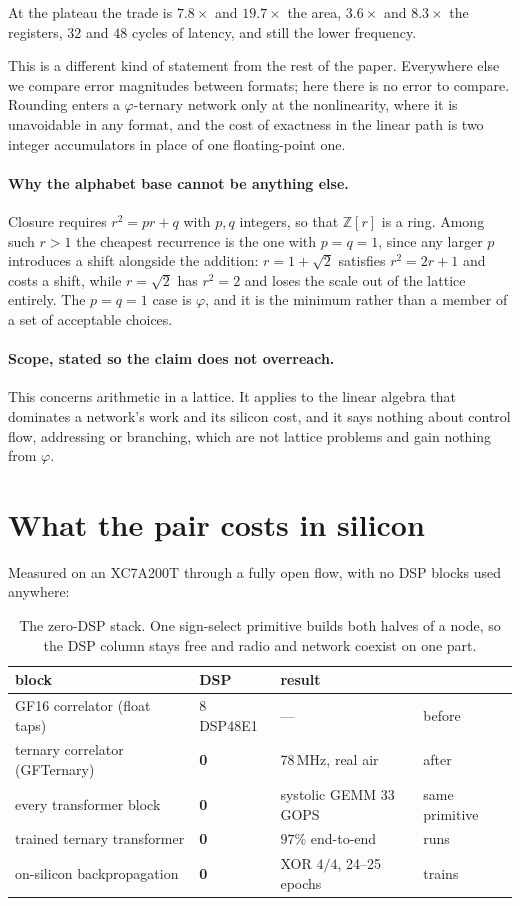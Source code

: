 \documentclass[11pt]{article}
\theoremstyle{definition}
\begin{document}
At the plateau the trade is $7.8\times$ and $19.7\times$ the area,
$3.6\times$ and $8.3\times$ the registers, $32$ and $48$ cycles of latency, and
still the lower frequency.


This is a different kind of statement from the rest of the paper. Everywhere else
we compare error magnitudes between formats; here there is no error to compare.
Rounding enters a $\varphi$-ternary network only at the nonlinearity, where it is
unavoidable in any format, and the cost of exactness in the linear path is two
integer accumulators in place of one floating-point one.

\paragraph{Why the alphabet base cannot be anything else.} Closure requires
$r^{2} = pr + q$ with $p,q$ integers, so that $\mathbb{Z}[r]$ is a ring. Among
such $r>1$ the cheapest recurrence is the one with $p=q=1$, since any larger $p$
introduces a shift alongside the addition: $r = 1+\sqrt2$ satisfies
$r^2 = 2r+1$ and costs a shift, while $r=\sqrt2$ has $r^2 = 2$ and loses the
scale out of the lattice entirely. The $p=q=1$ case is $\varphi$, and it is the
minimum rather than a member of a set of acceptable choices.

\paragraph{Scope, stated so the claim does not overreach.} This concerns
arithmetic in a lattice. It applies to the linear algebra that dominates a
network's work and its silicon cost, and it says nothing about control flow,
addressing or branching, which are not lattice problems and gain nothing from
$\varphi$.


\section{What the pair costs in silicon}

Measured on an XC7A200T through a fully open flow, with no DSP blocks used
anywhere:

\begin{table}[t]\centering
\caption{The zero-DSP stack. One sign-select primitive builds both halves of a
node, so the DSP column stays free and radio and network coexist on one part.}
\label{tab:zerodsp}
\begin{tabular}{llll}
\toprule
block & DSP & result & \\
\midrule
GF16 correlator (float taps) & 8 DSP48E1 & --- & before \\
ternary correlator (GFTernary) & \textbf{0} & 78\,MHz, real air & after \\
every transformer block & \textbf{0} & systolic GEMM 33\,GOPS & same primitive \\
trained ternary transformer & \textbf{0} & $97\%$ end-to-end & runs \\
on-silicon backpropagation & \textbf{0} & XOR $4/4$, 24--25 epochs & trains \\
\bottomrule
\end{tabular}
\end{table}
\end{document}

